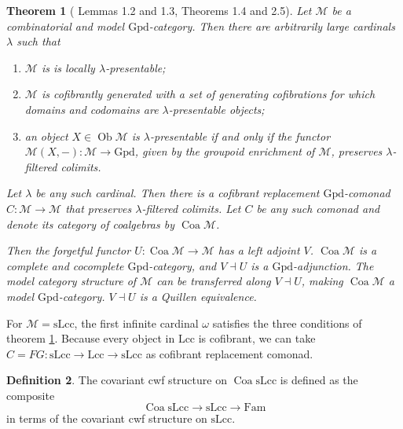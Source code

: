 \documentclass[a4paper]{article}
\newtheorem{theorem}{Theorem}
\theoremstyle{remark}
\theoremstyle{definition}
\newtheorem{definition}[theorem]{Definition}
\begin{document}
\begin{theorem}[\cite{coalgebraic-models} Lemmas 1.2 and 1.3, Theorems 1.4 and 2.5]
  \label{th:coalgebraic-model-category}
  Let $\mathcal{M}$ be a combinatorial and model $\mathrm{Gpd}$-category.
  Then there are arbitrarily large cardinals $\lambda$ such that
  \begin{enumerate}
    \item
      $\mathcal{M}$ is is locally $\lambda$-presentable;
    \item
      $\mathcal{M}$ is cofibrantly generated with a set of generating cofibrations for which domains and codomains are $\lambda$-presentable objects;
    \item
      an object $X \in \operatorname{Ob} \mathcal{M}$ is $\lambda$-presentable if and only if the functor $\mathcal{M}(X, -) : \mathcal{M} \rightarrow \mathrm{Gpd}$, given by the groupoid enrichment of $\mathcal{M}$, preserves $\lambda$-filtered colimits.
  \end{enumerate}

  Let $\lambda$ be any such cardinal.
  Then there is a cofibrant replacement $\mathrm{Gpd}$-comonad $C : \mathcal{M} \rightarrow \mathcal{M}$ that preserves $\lambda$-filtered colimits. 
  Let $C$ be any such comonad and denote its category of coalgebras by $\operatorname{Coa} \mathcal{M}$.

  Then the forgetful functor $U : \operatorname{Coa} \mathcal{M} \rightarrow \mathcal{M}$ has a left adjoint $V$.
  $\operatorname{Coa} \mathcal{M}$ is a complete and cocomplete $\mathrm{Gpd}$-category, and $V \dashv U$ is a $\mathrm{Gpd}$-adjunction.
  The model category structure of $\mathcal{M}$ can be transferred along $V \dashv U$, making $\operatorname{Coa} \mathcal{M}$ a model $\mathrm{Gpd}$-category.
  $V \dashv U$ is a Quillen equivalence.
\end{theorem}

For $\mathcal{M} = \mathrm{sLcc}$, the first infinite cardinal $\omega$ satisfies the three conditions of theorem \ref{th:coalgebraic-model-category}.
Because every object in $\mathrm{Lcc}$ is cofibrant, we can take $C = FG : \mathrm{sLcc} \rightarrow \mathrm{Lcc} \rightarrow \mathrm{sLcc}$ as cofibrant replacement comonad.

\begin{definition}
  The covariant cwf structure on $\operatorname{Coa} \mathrm{sLcc}$ is defined as the composite
  \begin{equation}
    \operatorname{Coa} \mathrm{sLcc} \rightarrow \mathrm{sLcc} \rightarrow \mathrm{Fam}
  \end{equation}
  in terms of the covariant cwf structure on $\mathrm{sLcc}$.
\end{definition}
\end{document}
